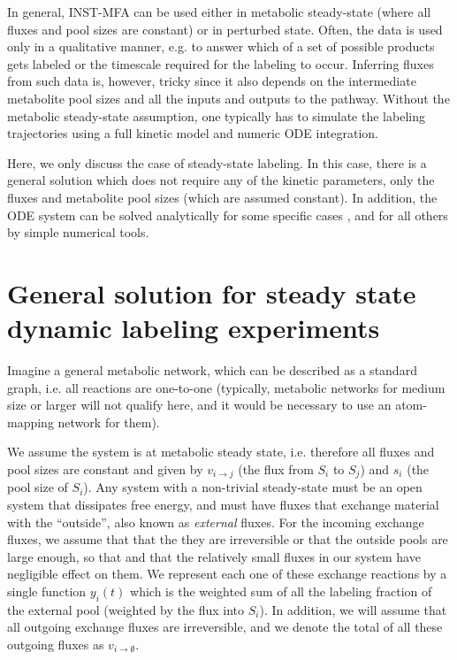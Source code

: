\documentclass{article}
\newcommand{\flux}[2]{\ensuremath{v_{{#1} \rightarrow {#2}}}}
\begin{document}
In general, INST-MFA can be used either in metabolic steady-state (where all fluxes and pool sizes are constant) or in perturbed state. Often, the data is used only in a qualitative manner, e.g. to answer which of a set of possible products gets labeled or the timescale required for the labeling to occur. Inferring fluxes from such data is, however, tricky since it also depends on the intermediate metabolite pool sizes and all the inputs and outputs to the pathway. Without the metabolic steady-state assumption, one typically has to simulate the labeling trajectories using a full kinetic model and numeric ODE integration.

Here, we only discuss the case of steady-state labeling. In this case, there is a general solution \cite{young_elementary_2008} which does not require any of the kinetic parameters, only the fluxes and metabolite pool sizes (which are assumed constant). In addition, the ODE system can be solved analytically for some specific cases \cite{sokol_theoretical_2015}, and for all others by simple numerical tools.

\section{General solution for steady state dynamic labeling experiments}
Imagine a general metabolic network, which can be described as a standard graph, i.e. all reactions are one-to-one (typically, metabolic networks for medium size or larger will not qualify here, and it would be necessary to use an atom-mapping network for them).

We assume the system is at metabolic steady state, i.e. therefore all fluxes and pool sizes are constant and given by \flux{i}{j} (the flux from $S_i$ to $S_j$) and $s_i$ (the pool size of $S_i$). Any system with a non-trivial steady-state must be an open system that dissipates free energy, and must have fluxes that exchange material with the ``outside'', also known as \textit{external} fluxes. For the incoming exchange fluxes, we assume that that the they are irreversible or that the outside pools are large enough, so that and that the relatively small fluxes in our system have negligible effect on them. We represent each one of these exchange reactions by a single function $y_i(t)$ which is the weighted sum of all the labeling fraction of the external pool (weighted by the flux into $S_i$).
In addition, we will assume that all outgoing exchange fluxes are irreversible, and we denote the total of all these outgoing fluxes as $\flux{i}{\emptyset}$.
\end{document}
